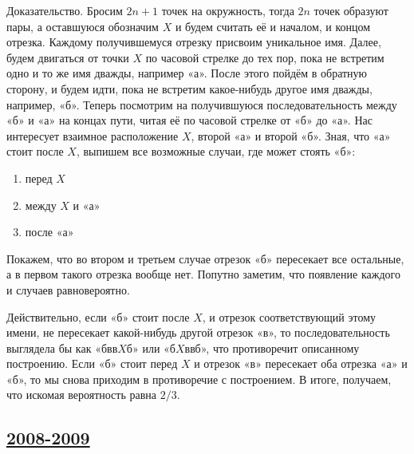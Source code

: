 \begin{enumerate}
Доказательство. Бросим $2n+1$ точек на окружность, тогда $2n$ точек образуют пары, а оставшуюся обозначим $X$ и будем считать её и началом, и концом отрезка.
Каждому получившемуся отрезку присвоим уникальное имя.
Далее, будем двигаться от точки $X$ по часовой стрелке до тех пор, пока не встретим одно и то же имя дважды, например «а».
После этого пойдём в обратную сторону, и будем идти, пока не встретим какое-нибудь другое имя дважды, например, «б».
Теперь посмотрим на получившуюся последовательность между «б» и «а» на концах пути, читая её по часовой стрелке от «б» до «а».
Нас интересует взаимное расположение $X$, второй «а» и второй «б».
Зная, что «а» стоит после $X$, выпишем все возможные случаи, где может стоять «б»:
\begin{enumerate}
\item перед $X$
\item между $X$ и «а»
\item после «а»
\end{enumerate}
Покажем, что во втором и третьем случае отрезок «б» пересекает все остальные, а в первом такого отрезка вообще нет. Попутно заметим, что появление каждого и случаев равновероятно.

Действительно, если «б» стоит после $X$, и отрезок соответствующий этому имени, не пересекает какой-нибудь другой отрезок «в», то последовательность выглядела бы как «бвв$X$б» или «б$X$ввб», что противоречит описанному построению.
Если «б» стоит перед $X$ и отрезок «в» пересекает оба отрезка «а» и «б», то мы снова приходим в противоречие с построением.
В итоге, получаем, что искомая вероятность равна $2/3$.
\end{enumerate}


\subsection[2008-2009]{\hyperref[sec:kr_02_2008_2009]{2008-2009}}
\label{sec:sol_kr_02_2008_2009}

